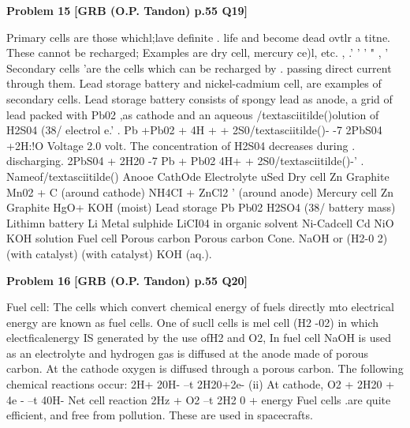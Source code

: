 \begin{problembox}
\textbf{Problem 15} \hfill \textbf{[GRB (O.P. Tandon) p.55 Q19]}
\label{q:ext-grb_all_questions-15}

Primary cells are those whichl;lave definite . life and 
become dead ovtlr a titne. These cannot be recharged; Examples 
are dry cell, mercury ce)l, etc. , .' 
' ' 
" , 
' 
Secondary cells 'are the cells which can be recharged by . 
passing direct current through them. Lead storage battery and 
nickel-cadmium cell, are examples of secondary cells. Lead 
storage battery consists of spongy lead as anode, a grid of lead 
packed with Pb02 ,as cathode and an aqueous /textasciitilde()olution of H2S04 
(38/%
electrol e.' 
. 
Pb +Pb02 + 4H + + 2S0/textasciitilde()- -7 
2PbS04 +2H:!O 
Voltage 2.0 volt. The concentration 
of H2S04 decreases during 
. 
discharging. 
2PbS04 + 2H20 -7 Pb + Pb02 
4H+ + 2S0/textasciitilde()-' 
. Nameof/textasciitilde() 
Anooe 
CathOde 
Electrolyte 
uSed 
Dry cell 
Zn 
Graphite 
Mn02 + C 
(around 
cathode) 
NH4CI + ZnCl2 ' 
(around anode) 
Mercury cell 
Zn 
Graphite 
HgO+ KOH 
(moist) 
Lead 
storage 
Pb 
Pb02 
H2SO4 
(38/%
battery 
mass) 
Lithimn battery 
Li 
Metal sulphide LiCI04 in organic 
solvent 
Ni-Cadcell 
Cd 
NiO 
KOH solution 
Fuel cell 
Porous carbon Porous carbon 
Cone. 
NaOH 
or 
(H2-0 2) 
(with catalyst) (with catalyst) 
KOH (aq.).
\end{problembox}

\begin{problembox}
\textbf{Problem 16} \hfill \textbf{[GRB (O.P. Tandon) p.55 Q20]}
\label{q:ext-grb_all_questions-16}

Fuel cell: 
The cells which convert chemical energy of 
fuels directly mto electrical energy are known as fuel cells. One 
of sucll cells is mel cell (H2 -02) in which electficalenergy IS 
generated by the use ofH2 and O2, In fuel cell NaOH is used as 
an electrolyte and hydrogen gas is diffused at the anode made of 
porous carbon. At the cathode oxygen is diffused through a 
porous carbon. The following chemical reactions occur: 
2H+ 20H- --t 2H20+2e-
(ii) At cathode, O2 + 2H20 + 4e - --t 40H-
Net cell reaction 
2Hz + O2 --t 2H2 0 + energy 
Fuel cells .are quite efficient, and free from pollution. These 
are used in spacecrafts.
\end{problembox}

